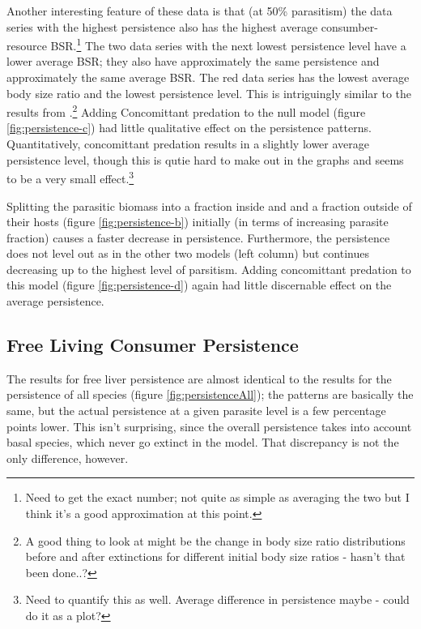 \documentclass[11pt]{amsart}
\begin{document}
Another interesting feature of these data is that (at 50\% parasitism) the data series with the highest persistence also has the highest average consumber-resource BSR.\footnote{Need to get the exact number; not quite as simple as averaging the two but I think it's a good approximation at this point.}  The two data series with the next lowest persistence level have a lower average BSR; they also have approximately the same persistence and approximately the same average BSR.  The red data series has the lowest average body size ratio and the lowest persistence level.  This is intriguingly similar to the results from \cite{Brose2006}.\footnote{A good thing to look at might be the change in body size ratio distributions before and after extinctions for different initial body size ratios - hasn't that been done..?} 
Adding Concomittant predation to the null model (figure \ref{fig:persistence-c}) had little qualitative effect on the persistence patterns.  Quantitatively, concomittant predation results in a slightly lower average persistence level, though this is qutie hard to make out in the graphs and seems to be a very small effect.\footnote{Need to quantify this as well.  Average difference in persistence maybe - could do it as a plot?}

Splitting the parasitic biomass into a fraction inside and and a fraction outside of their hosts (figure \ref{fig:persistence-b}) initially (in terms of increasing parasite fraction) causes a faster decrease in persistence.  
Furthermore, the persistence does not level out as in the other two models (left column) but continues decreasing up to the highest level of parsitism.  Adding concomittant predation to this model (figure \ref{fig:persistence-d}) again had little discernable effect on the average persistence.

\subsection{Free Living Consumer Persistence \label{sec:persistenceFree}}

The results for free liver persistence are almost identical to the results for the persistence of all species (figure \ref{fig:persistenceAll}); the patterns are basically the same, but the actual persistence at a given parasite level is a few percentage points lower.  This isn't surprising, since the overall persistence takes into account basal species, which never go extinct in the model.  That discrepancy is not the only difference, however.
\end{document}
